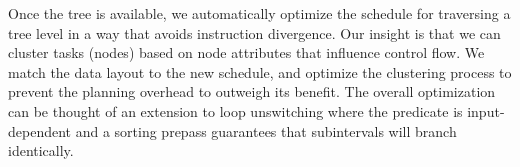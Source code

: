 Once the tree is available, we automatically optimize the schedule for traversing a tree level in a way that avoids instruction divergence. Our insight is that we can cluster tasks (nodes) based on node attributes that influence control flow. We match the data layout to the new schedule, and optimize the clustering process to prevent the planning overhead to outweigh its benefit. The overall optimization can be thought of an extension to loop unswitching where the predicate is input-dependent and a sorting prepass guarantees that subintervals will branch identically.

\begin{figure}
 \\

\end{figure}
